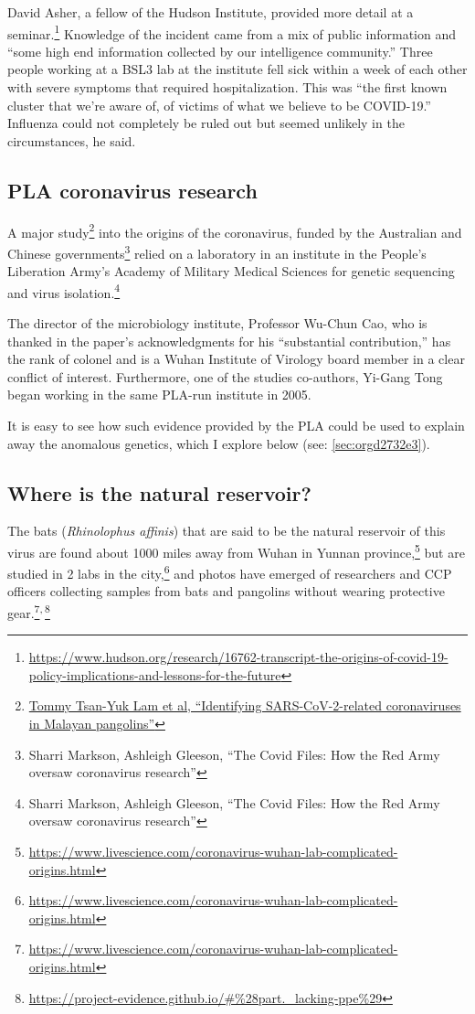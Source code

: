 \documentclass[11pt]{article}
\begin{document}
David Asher, a fellow of the Hudson Institute, provided more detail at a seminar.\footnote{\url{https://www.hudson.org/research/16762-transcript-the-origins-of-covid-19-policy-implications-and-lessons-for-the-future}} Knowledge of the incident came from a mix of public information and ``some high end information collected by our intelligence community.'' Three people working at a BSL3 lab at the institute fell sick within a week of each other with severe symptoms that required hospitalization. This was ``the first known cluster that we’re aware of, of victims of what we believe to be COVID-19.'' Influenza could not completely be ruled out but seemed unlikely in the circumstances, he said.
\subsection{PLA coronavirus research}
\label{sec:org30f3188}
A major study\footnote{\href{https://www.nature.com/articles/s41586-020-2169-0.pdf}{Tommy Tsan-Yuk Lam et al, ``Identifying SARS-CoV-2-related coronaviruses in Malayan pangolins''}} into the origins of the coronavirus, funded by the Australian and Chinese governments\footnote{Sharri Markson, Ashleigh Gleeson, ``The Covid Files: How the Red Army oversaw coronavirus research''} relied on a laboratory in an institute in the People’s Liberation Army’s Academy of Military Medical Sciences for genetic sequencing and virus isolation.\footnote{Sharri Markson, Ashleigh Gleeson, ``The Covid Files: How the Red Army oversaw coronavirus research''}

The director of the microbiology institute, Professor Wu-Chun Cao, who is thanked in the paper’s acknowledgments for his “substantial contribution,” has the rank of colonel and is a Wuhan Institute of Virology board member in a clear conflict of interest. Furthermore, one of the studies co-authors, Yi-Gang Tong began working in the same PLA-run institute in 2005.

It is easy to see how such evidence provided by the PLA could be used to explain away the anomalous genetics, which I explore below (see: \ref{sec:orgd2732e3}).
\subsection{Where is the natural reservoir?}
\label{sec:org5c3e83a}
The bats (\emph{Rhinolophus affinis}) that are said to be the natural reservoir of this virus are found about 1000 miles away from Wuhan in Yunnan province,\footnote{\url{https://www.livescience.com/coronavirus-wuhan-lab-complicated-origins.html}} but are studied in 2 labs in the city,\footnote{\url{https://www.livescience.com/coronavirus-wuhan-lab-complicated-origins.html}} and photos have emerged of researchers and CCP officers collecting samples from bats and pangolins without wearing protective gear.\footnote{\url{https://www.livescience.com/coronavirus-wuhan-lab-complicated-origins.html}}\textsuperscript{,}\,\footnote{\url{https://project-evidence.github.io/\#\%28part.\_lacking-ppe\%29}}
\end{document}
